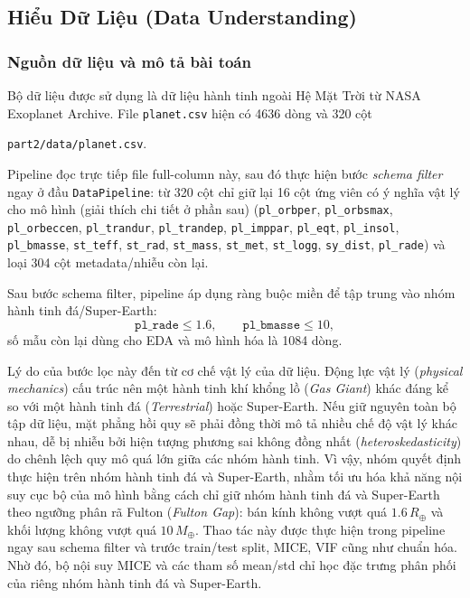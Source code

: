 ﻿\subsection{Hiểu Dữ Liệu (Data Understanding)}


\subsubsection{Nguồn dữ liệu và mô tả bài toán}
Bộ dữ liệu được sử dụng là dữ liệu hành tinh ngoài Hệ Mặt Trời từ NASA Exoplanet Archive.
File \texttt{planet.csv} hiện có 4636 dòng và 320 cột
\begin{center}
    \texttt{part2/data/planet.csv}.
\end{center}

Pipeline đọc trực tiếp file full-column này, sau đó thực hiện bước \emph{schema filter} ngay ở đầu
\texttt{DataPipeline}: từ 320 cột chỉ giữ lại 16 cột ứng viên có ý nghĩa vật lý cho mô hình (giải thích chi tiết ở phần sau)
(\texttt{pl\_orbper}, \texttt{pl\_orbsmax}, \texttt{pl\_orbeccen}, \texttt{pl\_trandur},
\texttt{pl\_trandep}, \texttt{pl\_imppar}, \texttt{pl\_eqt}, \texttt{pl\_insol},
\texttt{pl\_bmasse}, \texttt{st\_teff}, \texttt{st\_rad}, \texttt{st\_mass},
\texttt{st\_met}, \texttt{st\_logg}, \texttt{sy\_dist}, \texttt{pl\_rade}) và loại 304 cột metadata/nhiễu còn lại.

Sau bước schema filter, pipeline áp dụng ràng buộc miền để tập trung vào nhóm hành
tinh đá/Super-Earth:
\begin{equation}
    \texttt{pl\_rade} \le 1.6,\qquad \texttt{pl\_bmasse} \le 10,
\end{equation}
số mẫu còn lại dùng cho EDA và mô hình hóa là 1084 dòng.

Lý do của bước lọc này đến từ cơ chế vật lý của dữ liệu. Động lực vật lý
(\emph{physical mechanics}) cấu trúc nên một hành tinh khí khổng lồ
(\emph{Gas Giant}) khác đáng kể so với một hành tinh đá
(\emph{Terrestrial}) hoặc Super-Earth. Nếu giữ nguyên toàn bộ tập dữ liệu, mặt phẳng hồi quy sẽ
phải đồng thời mô tả nhiều chế độ vật lý khác nhau, dễ bị nhiễu bởi hiện tượng phương sai không
đồng nhất (\emph{heteroskedasticity}) do chênh lệch quy mô quá lớn giữa các nhóm hành tinh.
Vì vậy, nhóm quyết định thực hiện trên nhóm hành tinh đá và Super-Earth, nhằm tối ưu hóa khả năng nội suy
cục bộ của mô hình bằng cách chỉ giữ nhóm hành tinh đá và
Super-Earth theo ngưỡng phân rã Fulton (\emph{Fulton Gap}): bán kính không vượt quá
$1.6\,R_\oplus$ và khối lượng không vượt quá $10\,M_\oplus$. Thao tác này được thực hiện trong
pipeline ngay sau schema filter và trước train/test split, MICE, VIF cũng như chuẩn hóa. Nhờ đó,
bộ nội suy MICE và các tham số mean/std chỉ học đặc trưng phân phối của riêng nhóm hành tinh đá và
Super-Earth.

